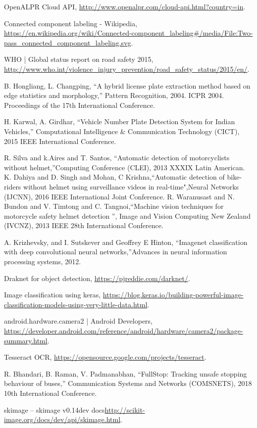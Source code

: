 \cleardoublepage
{}
{}
\begin{thebibliography}{99}

 OpenALPR Cloud API, \url{http://www.openalpr.com/cloud-api.html?country=in}.

 Connected component labeling - Wikipedia, \url{https://en.wikipedia.org/wiki/Connected-component_labeling#/media/File:Two-pass_connected_component_labeling.svg}.

 WHO | Global status report on road safety 2015, \url{http://www.who.int/violence_injury_prevention/road_safety_status/2015/en/}.

 B. Hongliang, L. Changping, ``A hybrid license plate extraction method based on edge statistics and morphology,'' Pattern Recognition, 2004. ICPR 2004. Proceedings of the 17th International Conference.

 H. Karwal, A. Girdhar, ``Vehicle Number Plate Detection System for Indian Vehicles,'' Computational Intelligence \& Communication Technology (CICT), 2015 IEEE International Conference.


 R. Silva and k.Aires and T. Santos, ``Automatic detection of motorcyclists without helmet,''Computing Conference (CLEI), 2013 XXXIX Latin American. 
 K. Dahiya and D. Singh and Mohan, C Krishna,``Automatic detection of bike-riders without helmet using surveillance videos in real-time",Neural Networks (IJCNN), 2016 IEEE International Joint Conference.
 R. Waranusast and N. Bundon and V. Timtong and C. Tangnoi,``Machine vision techniques for motorcycle safety helmet detection '', Image and Vision Computing New Zealand (IVCNZ), 2013 IEEE 28th International Conference.

A. Krizhevsky, and I. Sutskever and Geoffrey E Hinton, ``Imagenet classification with deep convolutional neural networks,''Advances in neural information processing systems, 2012.

 Draknet for object detection, \url{https://pjreddie.com/darknet/}.

 Image classification using keras, \url{https://blog.keras.io/building-powerful-image-classification-models-using-very-little-data.html}.

 android.hardware.camera2 | Android Developers, \url{https://developer.android.com/reference/android/hardware/camera2/package-summary.html}.

Tesseract OCR, \url{https://opensource.google.com/projects/tesseract}.

 R. Bhandari, B. Raman, V. Padmanabhan, ``FullStop: Tracking unsafe stopping behaviour of buses,'' Communication Systems and Networks (COMSNETS), 2018 10th International Conference.

 skimage -- skimage v0.14dev docs\url{http://scikit-image.org/docs/dev/api/skimage.html}.

\end{thebibliography}
